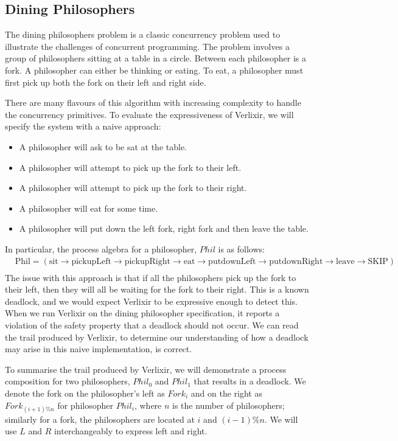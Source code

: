 \subsection{Dining Philosophers} \label{sec:dp}
The dining philosophers problem is a classic concurrency problem used to illustrate the challenges of concurrent programming. The problem involves a group of philosophers sitting at a table in a circle. Between each philosopher is a fork. A philosopher can either be thinking or eating. To eat, a philosopher must first pick up both the fork on their left and right side.
\par
There are many flavours of this algorithm with increasing complexity to handle the concurrency primitives. To evaluate the expressiveness of Verlixir, we will specify the system with a naive approach:
\begin{itemize}
    \item A philosopher will ask to be sat at the table.
    \item A philosopher will attempt to pick up the fork to their left.
    \item A philosopher will attempt to pick up the fork to their right.
    \item A philosopher will eat for some time.
    \item A philosopher will put down the left fork, right fork and then leave the table.
\end{itemize}
In particular, the process algebra for a philosopher, $Phil$ is as follows:
\[
\begin{aligned}
    & \text{Phil} = ( \text{sit} \rightarrow \text{pickupLeft} \rightarrow \text{pickupRight} \rightarrow \text{eat} \rightarrow \text{putdownLeft} \rightarrow \text{putdownRight} \rightarrow \text{leave} \rightarrow \text{SKIP}) \\
\end{aligned}
\]
The issue with this approach is that if all the philosophers pick up the fork to their left, then they will all be waiting for the fork to their right. This is a known deadlock, and we would expect Verlixir to be expressive enough to detect this. When we run Verlixir on the dining philosopher specification, it reports a violation of the safety property that a deadlock should not occur. We can read the trail produced by Verlixir, to determine our understanding of how a deadlock may arise in this naive implementation, is correct.
\par
To summarise the trail produced by Verlixir, we will demonstrate a process composition for two philosophers, $Phil_0$ and $Phil_1$ that results in a deadlock. We denote the fork on the philosopher's left as $Fork_{i}$ and on the right as $Fork_{(i+1)\%n}$ for philosopher $Phil_i$, where $n$ is the number of philosophers; similarly for a fork, the philosophers are located at $i$ and $(i-1)\%n$. We will use $L$ and $R$ interchangeably to express left and right. 
